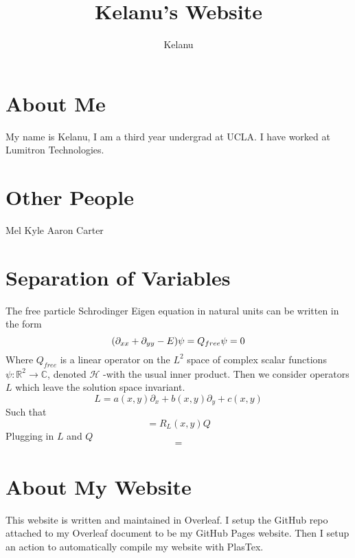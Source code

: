 \documentclass{article}
\title{Kelanu's Website}
\author{Kelanu}
\begin{document}
\maketitle
\section{About Me}
My name is Kelanu, I am a third year undergrad at UCLA. I have worked at Lumitron Technologies.

\newpage
\section{Other People}
Mel
Kyle
Aaron
Carter

\newpage
\section{Separation of Variables}
The free particle Schrodinger Eigen equation in natural units  can be written in the form
\begin{equation}
        (\partial_{xx}+\partial_{yy}-E)\psi = Q_{free}\psi = 0\\
\end{equation}
Where $Q_{free}$ is a linear operator on the $L^2$ space of complex scalar functions $\psi: \mathbb{R}^2 \rightarrow \mathbb{C}$, denoted $\mathcal{H}$ -with the usual inner product.
Then we consider operators $L$ which leave the solution space invariant.
\begin{equation}
    L = a(x,y)\partial_x+b(x,y)\partial_y+c(x,y)
\end{equation}
Such that
\begin{equation}
    [L,Q] = R_L(x,y) Q
\end{equation}
Plugging in $L$ and $Q$
\begin{equation}
    [L,Q] = 
\end{equation}

\newpage
\section{About My Website}
This website is written and maintained in Overleaf. I setup the GitHub repo attached to my Overleaf document to be my GitHub Pages website. Then I setup an action to automatically compile my website with PlasTex.
\end{document}
